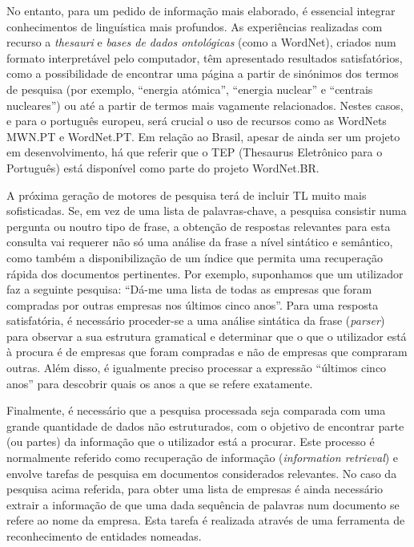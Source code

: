 \documentclass[]{../metanetpaper}
\begin{document}
\begin{multicols}{2}
No entanto, para um pedido de informação mais elaborado, é essencial integrar conhecimentos de linguística mais profundos. As experiências realizadas com recurso a \textit{thesauri} e \textit{bases de dados ontológicas} (como a WordNet), criados num formato interpretável pelo computador, têm apresentado resultados satisfatórios, como a possibilidade de encontrar uma página a partir de sinónimos dos termos de pesquisa (por exemplo, “energia atómica”, “energia nuclear” e “centrais nucleares”) ou até a partir de termos mais vagamente relacionados. Nestes casos, e para o português europeu, será crucial o uso de recursos como as WordNets MWN.PT e WordNet.PT. Em relação ao Brasil, apesar de ainda ser um projeto em desenvolvimento, há que referir que o TEP (Thesaurus Eletrônico para o Português) está disponível como parte do projeto WordNet.BR.

A próxima geração de motores de pesquisa terá de incluir TL muito mais sofisticadas. Se, em vez de uma lista de palavras-chave, a pesquisa consistir numa pergunta ou noutro tipo de frase, a obtenção de respostas relevantes para esta consulta vai requerer não só uma análise da frase a nível sintático e semântico, como também a disponibilização de um índice que permita uma recuperação rápida dos documentos pertinentes. Por exemplo, suponhamos que um utilizador faz a seguinte pesquisa: “Dá-me uma lista de todas as empresas que foram compradas por ou\-tras empresas nos últimos cinco anos”. Para uma res\-pos\-ta satisfatória, é necessário proceder-se a uma análise sintática da frase (\textit{parser}) para observar a sua estrutura gramatical e determinar que o que o utilizador está à procura é de empresas que foram compradas e não de empresas que compraram ou\-tras. Além disso, é igualmente preciso processar a expressão “últimos cinco anos” para descobrir quais os anos a que se refere exatamente.


Finalmente, é necessário que a pesquisa processada seja comparada com uma grande quantidade de dados não estruturados, com o objetivo de encontrar parte (ou partes) da informação que o utilizador está a procurar. Este processo é normalmente referido como recuperação de informação (\textit{information retrieval}) e envolve tarefas de pesquisa em documentos considerados relevantes. No caso da pesquisa acima referida, para obter uma lista de empresas é ainda necessário extrair a informação de que uma dada sequência de palavras num documento se refere ao nome da empresa. Esta tarefa é realizada através de uma ferramenta de reconhecimento de entidades nomeadas.


\end{multicols}
\end{document}
